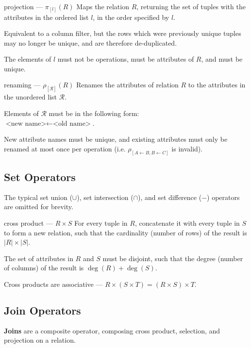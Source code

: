 \begin{defn}{projection --- $\pi_{[l]}(R)$}
    Maps the relation $R$, returning the set of tuples with the attributes in the ordered list $l$, in the order specified by $l$.

    Equivalent to a column filter, but the rows which were previously unique tuples may no longer be unique, and are therefore de-duplicated.

    The elements of $l$ must not be operations, must be attributes of $R$, and must be unique.
\end{defn}

\begin{defn}{renaming --- $\rho_{[\mathcal{R} ]}(R)$}
    Renames the attributes of relation $R$ to the attributes in the unordered list $\mathcal{R}$.

    Elements of $\mathcal{R}$ must be in the following form: \\
    $\text{<new name>} \leftarrow \text{<old name>}$.

    New attribute names must be unique, and existing attributes must only be renamed at most once per operation (i.e. $\rho_{[A \leftarrow B, B \leftarrow C]}$ is invalid).
\end{defn}

\subsection{Set Operators}
The typical set union ($\cup$), set intersection ($\cap$), and set difference ($-$) operators are omitted for brevity.

\begin{defn}{cross product --- $R \times S$}
    For every tuple in $R$, concatenate it with every tuple in $S$ to form a new relation, such that the cardinality (number of rows) of the result is $|R| \times |S|$.

    The set of attributes in $R$ and $S$ must be disjoint, such that the degree (number of columns) of the result is $\operatorname*{deg}(R) + \operatorname*{deg}(S)$.

    Cross products are associative --- $R \times (S \times T) = (R \times S) \times T$.
\end{defn}

\subsection{Join Operators}
\textbf{Joins} are a composite operator, composing cross product, selection, and projection on a relation.

